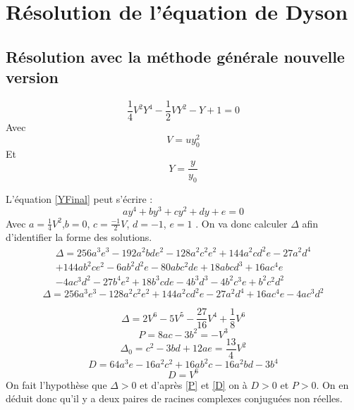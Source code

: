 \documentclass[12pt]{article}
\begin{document}
\section{R\'esolution de l'\'equation de Dyson}
\subsection{R\'esolution avec la m\'ethode g\'en\'erale nouvelle version}

\begin{equation}
\label{YFinal}
 \frac{1}{4} V ^2 Y^4 - \frac{1}{2} V Y^2 -Y + 1 = 0
\end{equation}
Avec 
\begin{equation}
 V = u y_0^2
\end{equation}
Et 
\begin{equation}
 Y = \frac{y}{y_0}
\end{equation}

L'\'equation \ref{YFinal} peut s'\'ecrire :
\begin{equation}
 a y^4 + b y^3 + c y^2 + d y + e = 0
\end{equation}
Avec $a = \frac{1}{4}V^2$,$b = 0$, $c=\frac{-1}{2}V$, $d = -1$, $e=1$ .
\newline
On va donc calculer $\Delta$ afin d'identifier la forme des solutions.
\begin{align*}
\label{Delta}
 \Delta = 256a^3 e^3 - 192 a^2bde^2 - 128 a^2 c^2 e^2 + 144a^2cd^2e - 27a^2d^4\\ 
 + 144 ab^2ce^2 - 6ab^2d^2e - 80abc^2de + 18abcd^3 + 16ac^4e\\
 -4ac^3d^2-27b^4e^2+18b^3cde - 4b^3d^3 - 4b^2c^3e+b^2c^2d^2
 \end{align*}
\begin{equation}
 \Delta = 256a^3 e^3 - 128 a^2 c^2 e^2 + 144a^2cd^2e - 27a^2d^4 + 16ac^4e -4ac^3d^2
\end{equation}

\begin{equation}
 \Delta = 2V^6 - 5V^5 - \frac{27}{16} V^4 + \frac{1}{8}V^6
\end{equation}
\begin{equation}
\label{P}
 P = 8ac - 3b^2 = -V^3
\end{equation}
\begin{equation}
 \Delta_0 = c^2-3bd + 12ae = \frac{13}{4}V^2
\end{equation}
\begin{equation}
 D = 64a^3e -16a^2c^2 + 16ab^2c - 16a^2bd -3b^4
\end{equation}
\begin{equation}
\label{D}
 D = V^6
\end{equation}
On fait l'hypoth\`ese que $\Delta > 0$ et d'apr\`es \ref{P} et \ref{D} on \`a $ D>0$ et $P>0$.
On en d\'eduit donc qu'il y a deux paires de racines complexes conjugu\'ees non r\'eelles.
\end{document}
